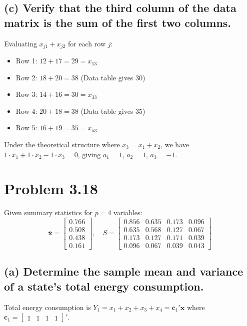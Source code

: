 \documentclass[11pt,a4paper]{article}
\begin{document}
\subsection*{(c) Verify that the third column of the data matrix is the sum of the first two columns.}

Evaluating $x_{j1} + x_{j2}$ for each row $j$:
\begin{itemize}
    \item Row 1: $12 + 17 = 29 = x_{13}$
    \item Row 2: $18 + 20 = 38$ (Data table gives $30$)
    \item Row 3: $14 + 16 = 30 = x_{33}$
    \item Row 4: $20 + 18 = 38$ (Data table gives $35$)
    \item Row 5: $16 + 19 = 35 = x_{53}$
\end{itemize}
Under the theoretical structure where $x_3 = x_1 + x_2$, we have $1 \cdot x_1 + 1 \cdot x_2 - 1 \cdot x_3 = 0$, giving $a_1 = 1$, $a_2 = 1$, $a_3 = -1$.

\hr

\section*{Problem 3.18}

Given summary statistics for $p=4$ variables:
\[
\overline{\mathbf{x}} = \begin{bmatrix} 0.766 \\ 0.508 \\ 0.438 \\ 0.161 \end{bmatrix}, \quad 
S = \begin{bmatrix} 
0.856 & 0.635 & 0.173 & 0.096 \\ 
0.635 & 0.568 & 0.127 & 0.067 \\ 
0.173 & 0.127 & 0.171 & 0.039 \\ 
0.096 & 0.067 & 0.039 & 0.043 
\end{bmatrix}
\]

\subsection*{(a) Determine the sample mean and variance of a state's total energy consumption.}

Total energy consumption is $Y_1 = x_1 + x_2 + x_3 + x_4 = \mathbf{c}_1' \mathbf{x}$ where $\mathbf{c}_1 = \begin{bmatrix} 1 & 1 & 1 & 1 \end{bmatrix}'$.
\end{document}
